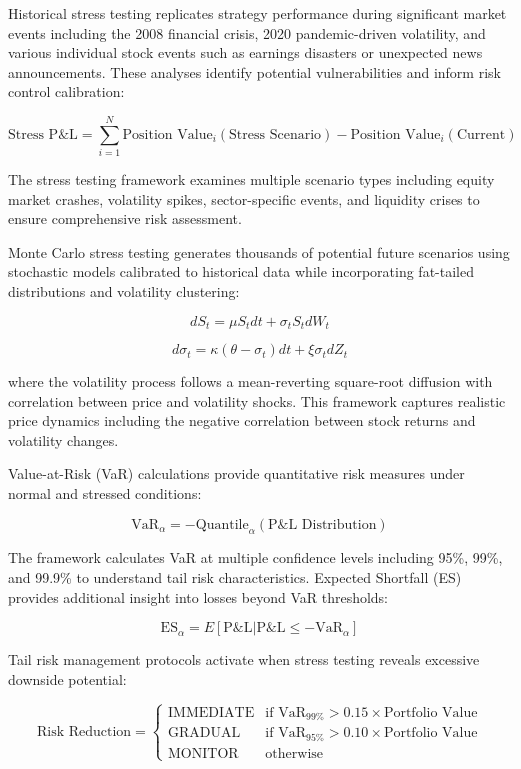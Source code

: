 \documentclass[
  american,
  11pt,
  11pt,
  letterpaper,
  onecolumn]{article}
\begin{document}
Historical stress testing replicates strategy performance during
significant market events including the 2008 financial crisis, 2020
pandemic-driven volatility, and various individual stock events such as
earnings disasters or unexpected news announcements. These analyses
identify potential vulnerabilities and inform risk control calibration:

\[\text{Stress P\&L} = \sum_{i=1}^{N} \text{Position Value}_i(\text{Stress Scenario}) - \text{Position Value}_i(\text{Current})\]

The stress testing framework examines multiple scenario types including
equity market crashes, volatility spikes, sector-specific events, and
liquidity crises to ensure comprehensive risk assessment.

Monte Carlo stress testing generates thousands of potential future
scenarios using stochastic models calibrated to historical data while
incorporating fat-tailed distributions and volatility clustering:

\[dS_t = \mu S_t dt + \sigma_t S_t dW_t\]

\[d\sigma_t = \kappa(\theta - \sigma_t)dt + \xi\sigma_t dZ_t\]

where the volatility process follows a mean-reverting square-root
diffusion with correlation between price and volatility shocks. This
framework captures realistic price dynamics including the negative
correlation between stock returns and volatility changes.

Value-at-Risk (VaR) calculations provide quantitative risk measures
under normal and stressed conditions:

\[\text{VaR}_{\alpha} = -\text{Quantile}_{\alpha}(\text{P\&L Distribution})\]

The framework calculates VaR at multiple confidence levels including
95\%, 99\%, and 99.9\% to understand tail risk characteristics. Expected
Shortfall (ES) provides additional insight into losses beyond VaR
thresholds:

\[\text{ES}_{\alpha} = E[\text{P\&L} | \text{P\&L} \leq -\text{VaR}_{\alpha}]\]

Tail risk management protocols activate when stress testing reveals
excessive downside potential:

\[\text{Risk Reduction} = \begin{cases}
\text{IMMEDIATE} & \text{if VaR}_{99\%} > 0.15 \times \text{Portfolio Value} \\
\text{GRADUAL} & \text{if VaR}_{95\%} > 0.10 \times \text{Portfolio Value} \\
\text{MONITOR} & \text{otherwise}
\end{cases}\]
\end{document}
